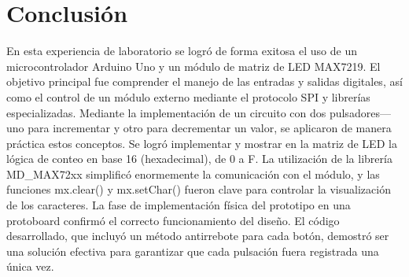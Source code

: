 \section{Conclusión}

En esta experiencia de  laboratorio se logró de forma exitosa el uso de un microcontrolador Arduino Uno
y un módulo de matriz de LED MAX7219. El objetivo principal fue comprender el manejo de las entradas y
salidas digitales, así como el control de un módulo externo mediante el protocolo SPI y librerías especializadas.
Mediante la implementación de un circuito con dos pulsadores—uno para incrementar y otro para decrementar
un valor, se aplicaron de manera práctica estos conceptos. Se logró implementar y mostrar en la matriz de
LED la lógica de conteo en base 16 (hexadecimal), de 0 a F. La utilización de la librería MD\_MAX72xx
simplificó enormemente la comunicación con el módulo, y las funciones mx.clear() y mx.setChar() fueron
clave para controlar la visualización de los caracteres.
La fase de implementación física del prototipo en una protoboard confirmó el correcto funcionamiento del
diseño. El código desarrollado, que incluyó un método antirrebote para cada botón, demostró ser una
solución efectiva para garantizar que cada pulsación fuera registrada una única vez.
